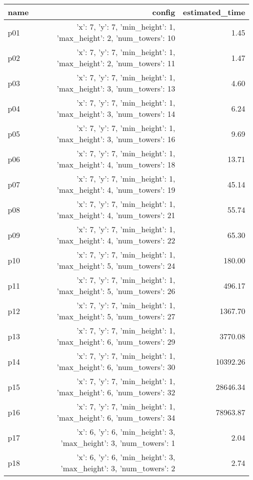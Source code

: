 \documentclass{article}
\begin{document}
                            \begin{center}
                            \scriptsize
                            \begin{tabular}{@{}l|r|r@{}}
                            name & config & estimated\_time\\\midrule
                              p01&{'x': 7, 'y': 7, 'min\_height': 1, 'max\_height': 2, 'num\_towers': 10}&1.45\\
  p02&{'x': 7, 'y': 7, 'min\_height': 1, 'max\_height': 2, 'num\_towers': 11}&1.47\\
  p03&{'x': 7, 'y': 7, 'min\_height': 1, 'max\_height': 3, 'num\_towers': 13}&4.60\\
  p04&{'x': 7, 'y': 7, 'min\_height': 1, 'max\_height': 3, 'num\_towers': 14}&6.24\\
  p05&{'x': 7, 'y': 7, 'min\_height': 1, 'max\_height': 3, 'num\_towers': 16}&9.69\\
  p06&{'x': 7, 'y': 7, 'min\_height': 1, 'max\_height': 4, 'num\_towers': 18}&13.71\\
  p07&{'x': 7, 'y': 7, 'min\_height': 1, 'max\_height': 4, 'num\_towers': 19}&45.14\\
  p08&{'x': 7, 'y': 7, 'min\_height': 1, 'max\_height': 4, 'num\_towers': 21}&55.74\\
  p09&{'x': 7, 'y': 7, 'min\_height': 1, 'max\_height': 4, 'num\_towers': 22}&65.30\\
  p10&{'x': 7, 'y': 7, 'min\_height': 1, 'max\_height': 5, 'num\_towers': 24}&180.00\\
  p11&{'x': 7, 'y': 7, 'min\_height': 1, 'max\_height': 5, 'num\_towers': 26}&496.17\\
  p12&{'x': 7, 'y': 7, 'min\_height': 1, 'max\_height': 5, 'num\_towers': 27}&1367.70\\
  p13&{'x': 7, 'y': 7, 'min\_height': 1, 'max\_height': 6, 'num\_towers': 29}&3770.08\\
  p14&{'x': 7, 'y': 7, 'min\_height': 1, 'max\_height': 6, 'num\_towers': 30}&10392.26\\
  p15&{'x': 7, 'y': 7, 'min\_height': 1, 'max\_height': 6, 'num\_towers': 32}&28646.34\\
  p16&{'x': 7, 'y': 7, 'min\_height': 1, 'max\_height': 6, 'num\_towers': 34}&78963.87\\
  p17&{'x': 6, 'y': 6, 'min\_height': 3, 'max\_height': 3, 'num\_towers': 1}&2.04\\
  p18&{'x': 6, 'y': 6, 'min\_height': 3, 'max\_height': 3, 'num\_towers': 2}&2.74\\

\end{tabular}
\end{center}
\end{document}
